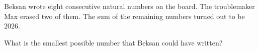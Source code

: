 Beksan wrote eight consecutive natural numbers on the board. The troublemaker Max erased two of them. The sum of the remaining numbers turned out to be $2026$.



What is the smallest possible number that Beksan could have written?
